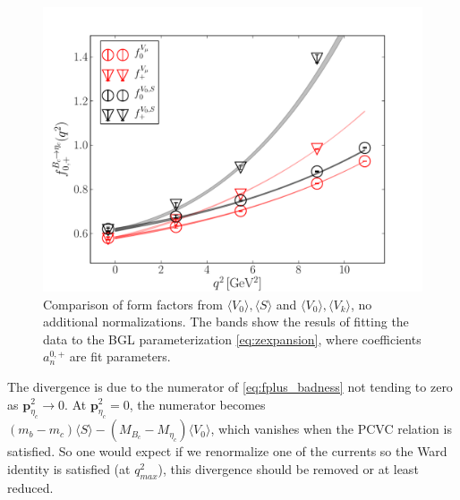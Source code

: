 \begin{figure}[htb!]
\centering
\includegraphics[scale=0.55]{images/nrqcd/Bcetac_bothways_1.pdf}
\caption{Comparison of form factors from $\langle V_0 \rangle, \langle S \rangle$ and $\langle V_0 \rangle,\langle V_k \rangle$, no additional normalizations. The bands show the resuls of fitting the data to the BGL parameterization \eqref{eq:zexpansion}, where coefficients $a^{0,+}_n$ are fit parameters. \label{fig:naive}}
\end{figure}
The divergence is due to the numerator of  \eqref{eq:fplus_badness} not tending to zero as ${\textbf{p}}_{\eta_c}^2\to 0$. At ${\textbf{p}}_{\eta_c}^2 = 0$, the numerator becomes $(m_b-m_c) \langle S \rangle - (M_{B_c}-M_{\eta_c}) \langle V_0 \rangle$, which vanishes when the PCVC relation is satisfied. So one would expect if we renormalize one of the currents so the Ward identity is satisfied (at $q^2_{max}$), this divergence should be removed or at least reduced.

